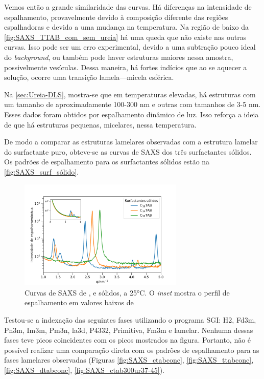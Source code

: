 	Vemos então a grande similaridade das curvas. Há diferenças na intensidade de espalhamento, provavelmente devido à composição diferente das regiões espalhadoras e devido a uma mudança na temperatura. Na região de baixo \q{} da \autoref{fig:SAXS_TTAB_com_sem_ureia} há uma queda que não existe nas outras curvas. Isso pode ser um erro experimental, devido a uma subtração pouco ideal do \emph{background}, ou também pode haver estruturas maiores nessa amostra, possivelmente vesículas. Dessa maneira, há fortes indícios que ao se aquecer a solução, ocorre uma transição lamela---micela esférica.
	
	Na \autoref{sec:Ureia-DLS}, mostra-se que em temperaturas elevadas, há estruturas com um tamanho de aproximadamente 100-300 nm e outras com tamanhos de 3-5 nm. Esses dados foram obtidos por espalhamento dinâmico de luz. Isso reforça a ideia de que há estruturas pequenas, micelares, nessa temperatura.
	 
	De modo a comparar as estruturas lamelares observadas com a estrutura lamelar do surfactante puro, obteve-se as curvas de SAXS dos três surfactantes sólidos. Os padrões de espalhamento para os surfactantes sólidos estão na \autoref{fig:SAXS_surf_sólido}.

	\begin{figure}[h]
		\centering
		\includegraphics[width=0.7\textwidth]{imagens/saxs/surfactante_solido}
		\caption{Curvas de SAXS de \CTAB{}, \TTAB{} e \DTAB{} sólidos, a 25°C. O \emph{inset} mostra o perfil de espalhamento em valores baixos de \q}
		\label{fig:SAXS_surf_sólido}
	\end{figure} 
	
	Testou-se a indexação das seguintes fases utilizando o programa SGI: H2, Fd3m, Pn3m, Im3m, Pm3n, la3d, P4332, Primitiva, Fm3m e lamelar. Nenhuma dessas fases teve picos coincidentes com os picos mostrados na figura. Portanto, não é possível realizar uma comparação direta com os padrões de espalhamento para as fases lamelares observadas (Figuras \ref{fig:SAXS_ctabconc}, \ref{fig:SAXS_ttabconc}, \ref{fig:SAXS_dtabconc}, \ref{fig:SAXS_ctab300ur37-45}).
	
